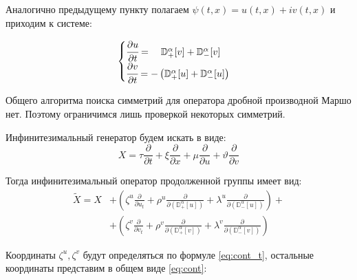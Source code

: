 \documentclass[a4paper, fontsize=14pt]{article}
\newcommand{\MD}[2]{\mathbb{D}_{#1}^{\alpha}[#2]} %
\begin{document}
Аналогично предыдущему пункту полагаем $\psi(t, x) = u(t, x) + i v(t, x)$ и приходим к системе:

\begin{equation}
  \label{eq:shredinger_MD_system}
  \begin{cases}
    \cfrac{\partial u}{\partial t} = \quad \MD{+}{v} + \MD{-}{v} \\
    \cfrac{\partial v}{\partial t} = - \left( \MD{+}{u} + \MD{-}{u} \right)
  \end{cases}
\end{equation}

Общего алгоритма поиска симметрий для оператора дробной производной Маршо нет.
Поэтому ограничимся лишь проверкой некоторых симметрий.

Инфинитезимальный генератор будем искать в виде:
\begin{equation*}
  X = \tau \frac{\partial}{\partial t}  + \xi \frac{\partial}{\partial x}  + \mu \frac{\partial}{\partial u}  + \vartheta  \frac{\partial}{\partial v}
\end{equation*}

Тогда инфинитезимальный оператор продолженной группы имеет вид:
\begin{equation}
  \label{eq:generator_md}
  \begin{split}
    \tilde{X} = X &+ \left(\zeta^u \frac{\partial }{\partial u_t} + \rho^u \frac{\partial }{\partial (\MD{+}{u})} + \lambda^u \frac{\partial }{\partial (\MD{-}{u})} \right) +\\
    &+\left(\zeta^v \frac{\partial }{\partial v_t}  + \rho^v \frac{\partial }{\partial (\MD{+}{v})}  + \lambda^v \frac{\partial }{\partial (\MD{-}{v})} \right)
  \end{split}
\end{equation}

Координаты $\zeta^u, \zeta^v$ будут определяться по формуле \eqref{eq:cont_t}, остальные координаты представим в общем виде \eqref{eq:cont}:
\end{document}
